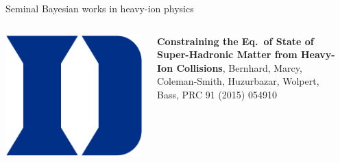 \documentclass{beamer}
\begin{document}
\begin{frame}{Seminal Bayesian works in heavy-ion physics}
\begin{columns}[T]
\begin{column}{0.05\textwidth}
      \includegraphics[width=.8\columnwidth]{duke}
    \end{column}
    \begin{column}{0.9\textwidth}
      \scriptsize {}
      \textbf{Constraining the Eq.\ of State of Super-Hadronic Matter from Heavy-Ion Collisions}, Bernhard, Marcy, Coleman-Smith, Huzurbazar, Wolpert, Bass, PRC 91 (2015) 054910
    \end{column}
    \begin{column}{0.025\textwidth}
    \end{column}
  \end{columns}

\end{frame}
\end{document}
